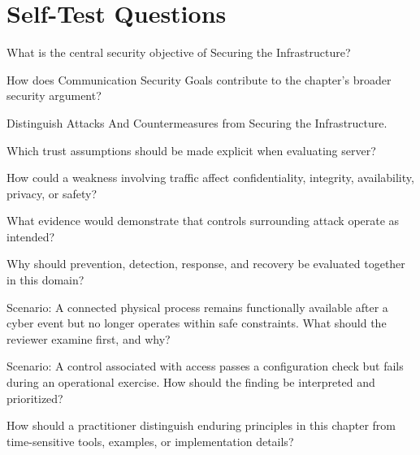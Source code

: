 \documentclass[11pt,letterpaper]{article}
\begin{document}
\section*{Self-Test Questions}
\begin{CornellRecallList}
\item What is the central security objective of Securing the Infrastructure?
\item How does Communication Security Goals contribute to the chapter's broader security argument?
\item Distinguish Attacks And Countermeasures from Securing the Infrastructure.
\item Which trust assumptions should be made explicit when evaluating server?
\item How could a weakness involving traffic affect confidentiality, integrity, availability, privacy, or safety?
\item What evidence would demonstrate that controls surrounding attack operate as intended?
\item Why should prevention, detection, response, and recovery be evaluated together in this domain?
\item Scenario: A connected physical process remains functionally available after a cyber event but no longer operates within safe constraints. What should the reviewer examine first, and why?
\item Scenario: A control associated with access passes a configuration check but fails during an operational exercise. How should the finding be interpreted and prioritized?
\item How should a practitioner distinguish enduring principles in this chapter from time-sensitive tools, examples, or implementation details?
\end{CornellRecallList}
\end{document}
